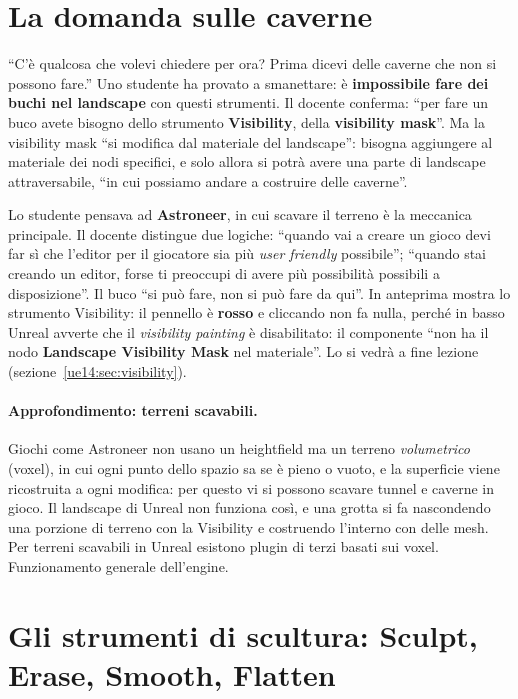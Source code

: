 \section{La domanda sulle caverne}
\label{ue14:sec:caverne}

``C'è qualcosa che volevi chiedere per ora? Prima dicevi delle caverne che non si possono
fare.'' Uno studente ha provato a smanettare: è \textbf{impossibile fare dei buchi nel
landscape} con questi strumenti. Il docente conferma: ``per fare un buco avete bisogno dello
strumento \textbf{Visibility}, della \textbf{visibility mask}''. Ma la visibility mask ``si
modifica dal materiale del landscape'': bisogna aggiungere al materiale dei nodi specifici,
e solo allora si potrà avere una parte di landscape attraversabile, ``in cui possiamo andare
a costruire delle caverne''.

Lo studente pensava ad \textbf{Astroneer}, in cui scavare il terreno è la meccanica
principale. Il docente distingue due logiche: ``quando vai a creare un gioco devi far sì che
l'editor per il giocatore sia più \emph{user friendly} possibile''; ``quando stai creando un
editor, forse ti preoccupi di avere più possibilità possibili a disposizione''. Il buco ``si
può fare, non si può fare da qui''. In anteprima mostra lo strumento Visibility: il pennello
è \textbf{rosso} e cliccando non fa nulla, perché in basso Unreal avverte che il
\emph{visibility painting} è disabilitato: il componente ``non ha il nodo \textbf{Landscape
Visibility Mask} nel materiale''. Lo si vedrà a fine lezione
(sezione~\ref{ue14:sec:visibility}).

\paragraph{Approfondimento: terreni scavabili.} Giochi come Astroneer non usano un
heightfield ma un terreno \emph{volumetrico} (voxel), in cui ogni punto dello spazio sa se è
pieno o vuoto, e la superficie viene ricostruita a ogni modifica: per questo vi si possono
scavare tunnel e caverne in gioco. Il landscape di Unreal non funziona così, e una grotta
si fa nascondendo una porzione di terreno con la Visibility e costruendo l'interno con
delle mesh. Per terreni scavabili in Unreal esistono plugin di terzi basati sui voxel.
Funzionamento generale dell'engine.

\section{Gli strumenti di scultura: Sculpt, Erase, Smooth, Flatten}
\label{ue14:sec:sculpt}

